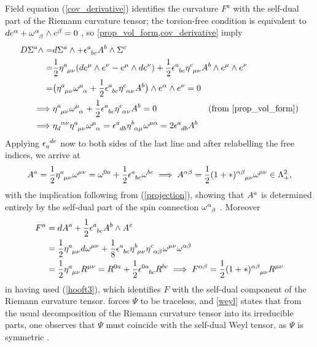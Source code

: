 \documentclass[a4paper,12pt, onecolumn, notitlepage]{article}
\theoremstyle{definition}
\theoremstyle{remark}
\newcommand{\al}{\alpha}
\newcommand{\w}{\omega}
\newcommand{\m}{\mu}
\newcommand{\n}{\nu}
\newcommand{\e}{\epsilon}
\newcommand{\hooft}[3]{\eta\indices{^{#1}_{#2}_{#3}}}
\newcommand{\ihooft}[3]{\eta\indices{_{#1}^{#2}^{#3}}}
\begin{document}
Field equation (\ref{cov_derivative}) identifies the curvature $F^{a}$ with the self-dual part of the Riemann curvature tensor; the torsion-free condition is equivalent to $de\indices{^\al} + \w\indices{^\al_\beta}\wedge e\indices{^\beta}=0$ \cite{eguchi_1980}, so \cref{prop_vol_form,cov_derivative} imply
\begin{align*}
	D\Sigma\indices{^a}\wedge =& d\Sigma\indices{^a}\wedge + \e\indices{^a_b_c}A\indices{^b}\wedge\Sigma\indices{^c}\\
	=&\frac{1}{2}\hooft{a}{\m}{\n}(de\indices{^\m}\wedge e\indices{^\n} - e\indices{^\m}\wedge de\indices{^\n}) +\frac{1}{2}\e\indices{^a_b_c}\hooft{c}{\m}{\n}A^{b}\wedge e^{\m}\wedge e^{\n}\\
	=&\big(\hooft{a}{\m}{\n}\w\indices{^\m_\al} +\frac{1}{2}\e\indices{^a_b_c}\hooft{c}{\al}{\n}A^{b}\big)\wedge e^{\al}\wedge e^{\n}=0\\
	\implies& \hooft{a}{\m}{\n}\w\indices{^\m_\al} +\frac{1}{2}\e\indices{^a_b_c}\hooft{c}{\al}{\n}A^{b}=0\qquad\qquad\qquad (\text{from \ref{prop_vol_form})}\\
	\implies& \ihooft{d}{\al}{\n}\hooft{a}{\m}{\n}\w\indices{^\m_\al}=\e\indices{^a_d_b}\hooft{b}{\al}{\m}\w\indices{^\m^\al}=2\e\indices{^a_d_b}A^{b}
\end{align*}
Applying $\e\indices{_a^d^e}$ now to both sides of the last line and after relabelling the free indices, we arrive at
\begin{align*}
	A\indices{^a}=\frac{1}{2}\hooft{a}{\m}{\n}\w\indices{^\m^\n} = \w\indices{^0^a} + \frac{1}{2} \e\indices{^a_b_c}\w\indices{^b^c}
	\implies A^{\al\beta} = \frac{1}{2}(1+\ast)\indices{^\al^\beta_\m_\n}\w\indices{^\m^\n}\in\Lambda^{2}_{+},
\end{align*}
with the implication following from (\ref{projection}), showing that $A\indices{^a}$ is determined entirely by the self-dual part of the spin connection $\w\indices{^\al_\beta}$ \cite{capovilla_1989}. Moreover
\begin{align*}
	F\indices{^a} &= dA\indices{^a} + \frac{1}{2}\e\indices{^a_b_c}A\indices{^b}\wedge A\indices{^c}\\
	&=\frac{1}{2}\hooft{a}{\m}{\n}d\w\indices{^\m^\n}+\frac{1}{8}\e\indices{^a_b_c}\hooft{b}{\m}{\n}\hooft{c}{\al}{\beta}\w\indices{^\m^\n} \w\indices{^\al^\beta}\\
	&=\frac{1}{2}\hooft{a}{\m}{\n}R\indices{^\m^\n}= R^{0a}+\frac{1}{2}\e\indices{^0^a_b_c}R^{bc}
	\implies F\indices{^\al^\beta} = \frac{1}{2}(1+\ast)\indices{^\al^\beta_\m_\n}R\indices{^\m^\n}
\end{align*}
in having used (\ref{hooft3}), which identifies $F$ with the self-dual component of the Riemann curvature tensor.  forces $\Psi$ to be traceless, and \cref{weyl} states that from the usual decomposition of the Riemann curvature tensor into its irreducible parts, one observes that $\Psi$ must coincide with the self-dual Weyl tensor, as $\Psi$ is symmetric \cite{capovilla_1993}.\\
	
\end{document}
